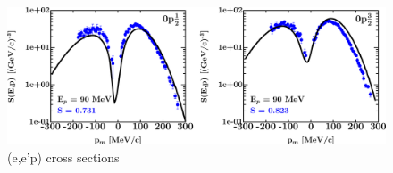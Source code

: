 \begin{figure}[H]
    \centering
    \includegraphics[width = 1.0\textwidth]{figures/o16_eep.png}
    \caption{(e,e'p) cross sections}
    \label{DOMFitData_o16_eep}
\end{figure}
